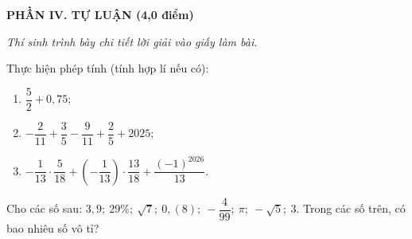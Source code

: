 \documentclass[12pt,a4paper]{article}
\begin{document}
\newpage
\setcounter{ex}{0}
\noindent\textbf{\large PHẦN IV. TỰ LUẬN (4,0 điểm)}

\textit{Thí sinh trình bày chi tiết lời giải vào giấy làm bài.}

\vspace{1mm}
\begin{ex}
Thực hiện phép tính (tính hợp lí nếu có):
\begin{enumerate}[label=\textbf{\alph*)}, leftmargin=0.8cm, itemsep=1pt]
\item $\dfrac{5}{2} + 0{,}75$;
\item $-\dfrac{2}{11} + \dfrac{3}{5} - \dfrac{9}{11} + \dfrac{2}{5} + 2025$;
\item $-\dfrac{1}{13} \cdot \dfrac{5}{18} + \left(-\dfrac{1}{13}\right) \cdot \dfrac{13}{18} + \dfrac{(-1)^{2026}}{13}$.
\end{enumerate}
\end{ex}
\vspace{1.5mm}

\begin{ex}
Cho các số sau: $3{,}9;\ 29\%;\ \sqrt{7};\ 0{,}(8);\ -\dfrac{4}{99};\ \pi;\ -\sqrt{5};\ 3$. Trong các số trên, có bao nhiêu số vô tỉ?
\end{ex}
\vspace{1.5mm}
\end{document}
